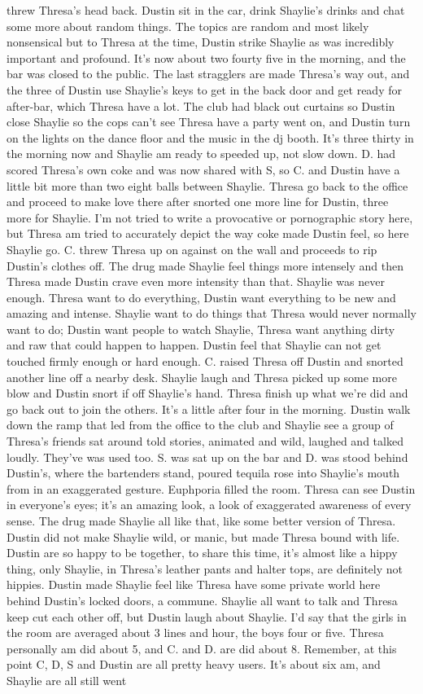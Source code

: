 \documentclass[12pt]{book}
\begin{document}
threw Thresa's head back. Dustin sit in the car, drink Shaylie's drinks and chat some more about random things. The topics are random and most likely nonsensical but to Thresa at the time, Dustin strike Shaylie as was incredibly important and profound. It's now about two fourty five in the morning, and the bar was closed to the public. The last stragglers are made Thresa's way out, and the three of Dustin use Shaylie's keys to get in the back door and get ready for after-bar, which Thresa have a lot. The club had black out curtains so Dustin close Shaylie so the cops can't see Thresa have a party went on, and Dustin turn on the lights on the dance floor and the music in the dj booth. It's three thirty in the morning now and Shaylie am ready to speeded up, not slow down. D. had scored Thresa's own coke and was now shared with S, so C. and Dustin have a little bit more than two eight balls between Shaylie. Thresa go back to the office and proceed to make love there after snorted one more line for Dustin, three more for Shaylie. I'm not tried to write a provocative or pornographic story here, but Thresa am tried to accurately depict the way coke made Dustin feel, so here Shaylie go. C. threw Thresa up on against on the wall and proceeds to rip Dustin's clothes off. The drug made Shaylie feel things more intensely and then Thresa made Dustin crave even more intensity than that. Shaylie was never enough. Thresa want to do everything, Dustin want everything to be new and amazing and intense. Shaylie want to do things that Thresa would never normally want to do; Dustin want people to watch Shaylie, Thresa want anything dirty and raw that could happen to happen. Dustin feel that Shaylie can not get touched firmly enough or hard enough. C. raised Thresa off Dustin and snorted another line off a nearby desk. Shaylie laugh and Thresa picked up some more blow and Dustin snort if off Shaylie's hand. Thresa finish up what we're did and go back out to join the others. It's a little after four in the morning. Dustin walk down the ramp that led from the office to the club and Shaylie see a group of Thresa's friends sat around told stories, animated and wild, laughed and talked loudly. They've was used too. S. was sat up on the bar and D. was stood behind Dustin's, where the bartenders stand, poured tequila rose into Shaylie's mouth from in an exaggerated gesture. Euphporia filled the room. Thresa can see Dustin in everyone's eyes; it's an amazing look, a look of exaggerated awareness of every sense. The drug made Shaylie all like that, like some better version of Thresa. Dustin did not make Shaylie wild, or manic, but made Thresa bound with life. Dustin are so happy to be together, to share this time, it's almost like a hippy thing, only Shaylie, in Thresa's leather pants and halter tops, are definitely not hippies. Dustin made Shaylie feel like Thresa have some private world here behind Dustin's locked doors, a commune. Shaylie all want to talk and Thresa keep cut each other off, but Dustin laugh about Shaylie. I'd say that the girls in the room are averaged about 3 lines and hour, the boys four or five. Thresa personally am did about 5, and C. and D. are did about 8. Remember, at this point C, D, S and Dustin are all pretty heavy users. It's about six am, and Shaylie are all still went 
\end{document}
